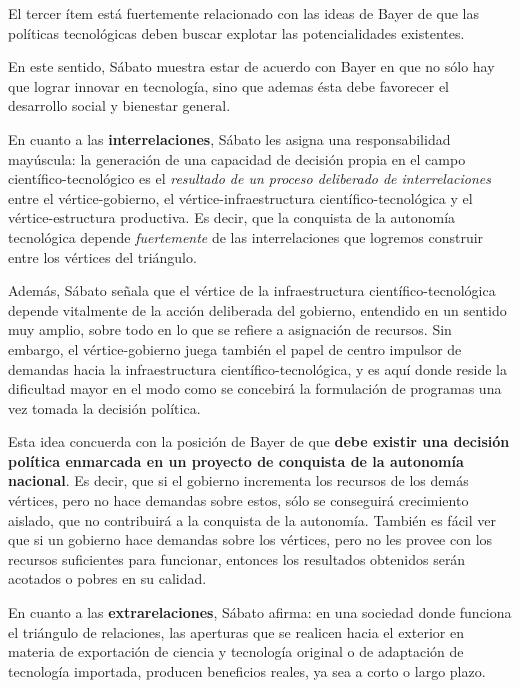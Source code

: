 El tercer ítem está fuertemente relacionado con las ideas de Bayer de que las políticas tecnológicas deben buscar explotar las potencialidades existentes.

En este sentido, Sábato muestra estar de acuerdo con Bayer en que no sólo hay que lograr innovar en tecnología, sino que ademas ésta debe favorecer el desarrollo social y bienestar general.

\vspace{0.5em}

En cuanto a las \textbf{interrelaciones}, Sábato les asigna una responsabilidad mayúscula: la generación de una capacidad de decisión propia en el campo científico-tecnológico es el \textit{resultado de un proceso deliberado de interrelaciones} entre el vértice-gobierno, el vértice-infraestructura científico-tecnológica y el vértice-estructura productiva.
Es decir, que la conquista de la autonomía tecnológica depende \textit{fuertemente} de las interrelaciones que logremos construir entre los vértices del triángulo.

Además, Sábato señala que el vértice de la infraestructura científico-tecnológica depende vitalmente de la acción deliberada del gobierno, entendido en un sentido muy amplio, sobre todo en lo que se refiere a asignación de recursos. Sin embargo, el vértice-gobierno juega también el papel de centro impulsor de demandas hacia la infraestructura científico-tecnológica, y es aquí donde reside la dificultad mayor en el modo como se concebirá la formulación de programas una vez tomada la decisión política.

Esta idea concuerda con la posición de Bayer de que \textbf{debe existir una decisión política enmarcada en un proyecto de conquista de la autonomía nacional}. Es decir, que si el gobierno incrementa los recursos de los demás vértices, pero no hace demandas sobre estos, sólo se conseguirá crecimiento aislado, que no contribuirá a la conquista de la autonomía. También es fácil ver que si un gobierno hace demandas sobre los vértices, pero no les provee con los recursos suficientes para funcionar, entonces los resultados obtenidos serán acotados o pobres en su calidad.

\vspace{0.5em}

En cuanto a las \textbf{extrarelaciones}, Sábato afirma: en una sociedad donde funciona el triángulo de relaciones, las aperturas que se realicen hacia el exterior en materia de exportación de ciencia y tecnología original o de adaptación de tecnología importada, producen beneficios reales, ya sea a corto o largo plazo.

